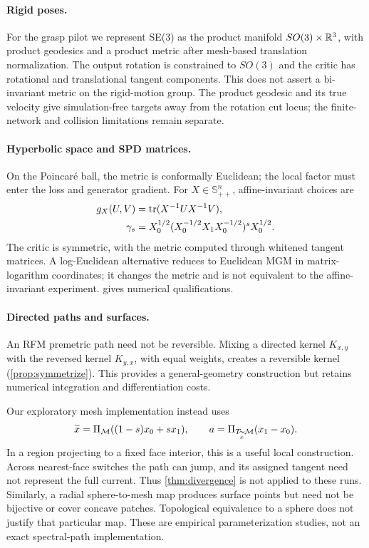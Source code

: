 \paragraph{Rigid poses.}
For the grasp pilot we represent SE(3) as the product manifold $SO(3)\times\mathbb R^3$, with product geodesics and a product metric after mesh-based translation normalization. The output rotation is constrained to $SO(3)$ and the critic has rotational and translational tangent components. This does not assert a bi-invariant metric on the rigid-motion group. The product geodesic and its true velocity give simulation-free targets away from the rotation cut locus; the finite-network and collision limitations remain separate.

\paragraph{Hyperbolic space and SPD matrices.}
On the Poincar\'e ball, the metric is conformally Euclidean; the local factor must enter the loss and generator gradient. For $X\in\mathbb S_{++}^n$, affine-invariant choices are
\begin{align}
g_X(U,V)&=\operatorname{tr}(X^{-1}UX^{-1}V),\notag\\
\gamma_s&=X_0^{1/2}(X_0^{-1/2}X_1X_0^{-1/2})^sX_0^{1/2}.
\label{eq:spd}
\end{align}
The critic is symmetric, with the metric computed through whitened tangent matrices. A log-Euclidean alternative \citep{arsigny2006log} reduces to Euclidean MGM in matrix-logarithm coordinates; it changes the metric and is not equivalent to the affine-invariant experiment.  gives numerical qualifications.

\paragraph{Directed paths and surfaces.}
An RFM premetric path need not be reversible. Mixing a directed kernel $K_{x,y}$ with the reversed kernel $K_{y,x}$, with equal weights, creates a reversible kernel (\cref{prop:symmetrize}). This provides a general-geometry construction but retains numerical integration and differentiation costs.

Our exploratory mesh implementation instead uses
\begin{equation}
\widetilde x=\Pi_\mathcal M((1-s)x_0+sx_1),\qquad
a=\Pi_{T_{\widetilde x}\mathcal M}(x_1-x_0).
\label{eq:mesh-surrogate}
\end{equation}
In a region projecting to a fixed face interior, this is a useful local construction. Across nearest-face switches the path can jump, and its assigned tangent need not represent the full current. Thus \cref{thm:divergence} is not applied to these runs. Similarly, a radial sphere-to-mesh map produces surface points but need not be bijective or cover concave patches. Topological equivalence to a sphere does not justify that particular map. These are empirical parameterization studies, not an exact spectral-path implementation.

